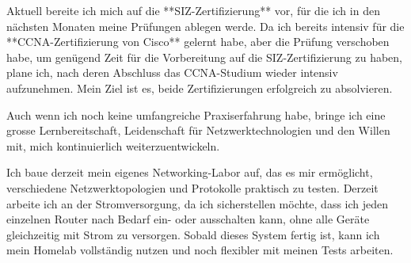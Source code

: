 \documentclass[11pt, a4paper]{awesome-cv}
\begin{document}
\begin{cvletter}
Aktuell bereite ich mich auf die **SIZ-Zertifizierung** vor, für die ich in den nächsten Monaten meine Prüfungen ablegen werde. Da ich bereits intensiv für die **CCNA-Zertifizierung von Cisco** gelernt habe, aber die Prüfung verschoben habe, um genügend Zeit für die Vorbereitung auf die SIZ-Zertifizierung zu haben, plane ich, nach deren Abschluss das CCNA-Studium wieder intensiv aufzunehmen. Mein Ziel ist es, beide Zertifizierungen erfolgreich zu absolvieren.


Auch wenn ich noch keine umfangreiche Praxiserfahrung habe, bringe ich eine grosse Lernbereitschaft, Leidenschaft für Netzwerktechnologien und den Willen mit, mich kontinuierlich weiterzuentwickeln. 


\newpage %


Ich baue derzeit mein eigenes Networking-Labor auf, das es mir ermöglicht, verschiedene Netzwerktopologien und Protokolle praktisch zu testen. Derzeit arbeite ich an der Stromversorgung, da ich sicherstellen möchte, dass ich jeden einzelnen Router nach Bedarf ein- oder ausschalten kann, ohne alle Geräte gleichzeitig mit Strom zu versorgen. Sobald dieses System fertig ist, kann ich mein Homelab vollständig nutzen und noch flexibler mit meinen Tests arbeiten.


\end{cvletter}
\end{document}
